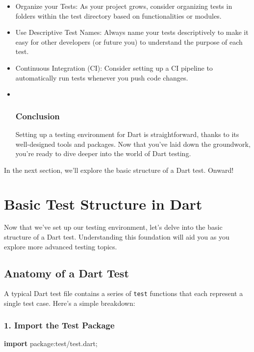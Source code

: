 \documentclass[
]{article}
\newenvironment{Shaded}{\begin{snugshade}}{\end{snugshade}}
\newcommand{\KeywordTok}[1]{\textcolor[rgb]{0.81,0.81,0.76}{\textbf{#1}}}
\newcommand{\NormalTok}[1]{\textcolor[rgb]{0.81,0.81,0.76}{#1}}
\newcommand{\StringTok}[1]{\textcolor[rgb]{0.96,0.31,0.31}{#1}}
\begin{document}
\begin{itemize}
\item
  Organize your Tests: As your project grows, consider organizing tests
  in folders within the test directory based on functionalities or
  modules.
\item
  Use Descriptive Test Names: Always name your tests descriptively to
  make it easy for other developers (or future you) to understand the
  purpose of each test.
\item
  Continuous Integration (CI): Consider setting up a CI pipeline to
  automatically run tests whenever you push code changes.
\item ~
  \subsubsection{Conclusion}\label{conclusion-1}

  Setting up a testing environment for Dart is straightforward, thanks
  to its well-designed tools and packages. Now that you've laid down the
  groundwork, you're ready to dive deeper into the world of Dart
  testing.
\end{itemize}

In the next section, we'll explore the basic structure of a Dart test.
Onward!

\section{Basic Test Structure in
Dart}\label{basic-test-structure-in-dart}

Now that we've set up our testing environment, let's delve into the
basic structure of a Dart test. Understanding this foundation will aid
you as you explore more advanced testing topics.

\subsection{Anatomy of a Dart Test}\label{anatomy-of-a-dart-test}

A typical Dart test file contains a series of \texttt{test} functions
that each represent a single test case. Here's a simple breakdown:

\subsubsection{1. Import the Test
Package}\label{import-the-test-package}

\begin{Shaded}
\begin{Highlighting}[]
\KeywordTok{import} \StringTok{\textquotesingle{}package:test/test.dart\textquotesingle{}}\NormalTok{;}
\end{Highlighting}
\end{Shaded}
\end{document}
